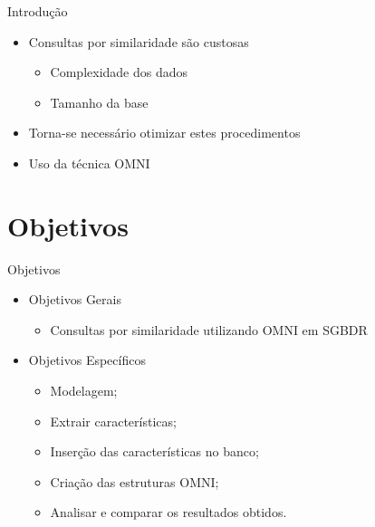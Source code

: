 \documentclass{beamer}
\begin{document}
\begin{frame}{Introdução}

  \begin{itemize}
   \item Consultas por similaridade são custosas\newline
   
   \begin{itemize}
      \item Complexidade dos dados\newline
      \item Tamanho da base\newline
   \end{itemize}
   
   \item Torna-se necessário otimizar estes procedimentos\newline
   
   \item Uso da técnica OMNI
  \end{itemize}

 
\end{frame}

\section{Objetivos}

\begin{frame}{Objetivos}
  \begin{itemize}
   \item Objetivos Gerais
   \begin{itemize}
      \item Consultas por similaridade utilizando OMNI em SGBDR\newline
   \end{itemize}
   \item Objetivos Específicos
   \begin{itemize}
      \item Modelagem;
      \item Extrair características;
      \item Inserção das características no banco;
      \item Criação das estruturas OMNI;
      \item Analisar e comparar os resultados obtidos.
   \end{itemize}
   
  \end{itemize}

\end{frame}
\end{document}

